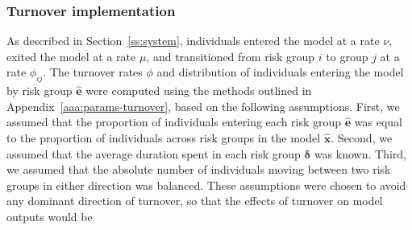 \subsubsection{Turnover implementation}
As described in Section~\ref{ss:system}, individuals
entered the model at a rate $\nu$,
exited the model at a rate $\mu$,
and transitioned from risk group $i$ to group $j$ at a rate $\phi_{ij}$.
The turnover rates $\phi$ and
distribution of individuals entering the model by risk group $\bm{\hat{e}}$
were computed using the methods outlined in
Appendix~\ref{aaa:params-turnover}, based on the following assumptions.
First, we assumed that
the proportion of individuals entering each risk group $\bm{\hat{e}}$
was equal to the proportion of individuals across risk groups in the model $\bm{\hat{x}}$.
Second, we assumed that
the average duration spent in each risk group $\bm{\delta}$ was known.
Third, we assumed that
the absolute number of individuals moving between two risk groups in either direction was balanced.
These assumptions were chosen to avoid any dominant direction of turnover,
so that the effects of turnover on model outputs would be
